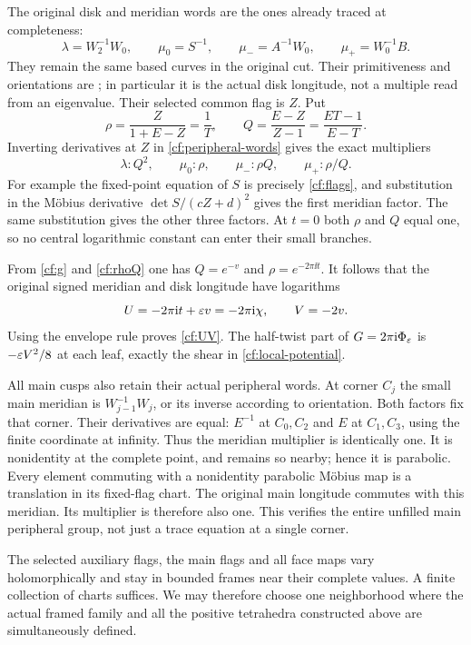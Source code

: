 The original disk and meridian words are the ones already
traced at completeness:
\begin{equation}\label{cf:peripheral-words}
 \lambda=W_2^{-1}W_0,\qquad
 \mu_0=S^{-1},\qquad
 \mu_-=A^{-1}W_0,\qquad
 \mu_+=W_0^{-1}B.
\end{equation}
They remain the same based curves in the original cut.
Their primitiveness and orientations are
\cite[equations~(7.1)--(7.5)]{Geometry}; in particular it is
the actual disk longitude, not a multiple read from an eigenvalue.
Their selected common flag is $Z$.
Put
\begin{equation}\label{cf:rhoQ}
 \rho=\frac{Z}{1+E-Z}=\frac1T,\qquad
 Q=\frac{E-Z}{Z-1}=\frac{ET-1}{E-T}.
\end{equation}
Inverting derivatives at $Z$ in
\eqref{cf:peripheral-words} gives the exact multipliers
\begin{equation}\label{cf:multipliers}
 \lambda:Q^2,\qquad
 \mu_0:\rho,\qquad
 \mu_-:\rho Q,\qquad
 \mu_+:\rho/Q.
\end{equation}
For example the fixed-point equation of $S$ is precisely
\eqref{cf:flags}, and substitution in the Möbius derivative
$\det S/(cZ+d)^2$ gives the first meridian factor.
The same substitution gives the other three factors.
At $t=0$ both $\rho$ and $Q$ equal one, so no central logarithmic
constant can enter their small branches.

From \eqref{cf:g} and \eqref{cf:rhoQ} one has
$Q=e^{-v}$ and $\rho=e^{-2\pi\ii t}$.
It follows that the original signed meridian and disk longitude
have logarithms
\begin{equation}\label{cf:primitive-logs}
 U=-2\pi\mathrm i t+\varepsilon v=-2\pi\mathrm i\chi,\qquad V=-2v.
\end{equation}
Using the envelope rule proves \eqref{cf:UV}.
The half-twist part of $G=2\pi\mathrm i\Phi_\varepsilon$ is
$-\varepsilon V^2/8$ at each leaf, exactly the shear in
\eqref{cf:local-potential}.

All main cusps also retain their actual peripheral words.
At corner $C_j$ the small main meridian is
$W_{j-1}^{-1}W_j$, or its inverse according to orientation.
Both factors fix that corner. Their derivatives are equal:
$E^{-1}$ at $C_0,C_2$ and $E$ at $C_1,C_3$, using the
finite coordinate at infinity. Thus the meridian multiplier
is identically one. It is nonidentity at the complete point,
and remains so nearby; hence it is parabolic.
Every element commuting with a nonidentity parabolic Möbius
map is a translation in its fixed-flag chart.
The original main longitude commutes with this meridian.
Its multiplier is therefore also one. This verifies
the entire unfilled main peripheral group, not just a
trace equation at a single corner.

The selected auxiliary flags, the main flags and all face
maps vary holomorphically and stay in bounded frames near
their complete values. A finite collection of charts suffices.
We may therefore choose one neighborhood where the actual
framed family and all the positive tetrahedra constructed above
are simultaneously defined.
